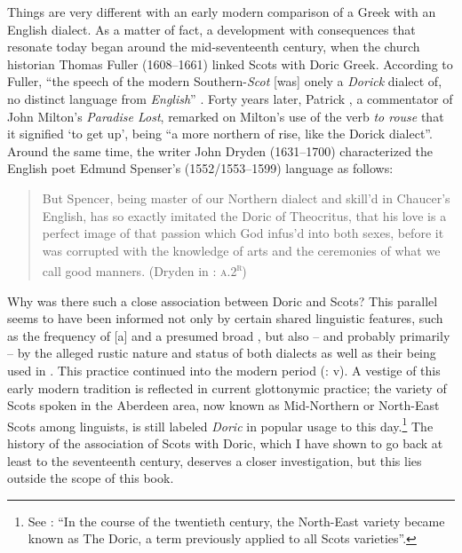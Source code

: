 Things are very different with an early modern comparison of a Greek with an English dialect. As a matter of fact, a development with consequences that resonate today began around the mid-seventeenth century, when the church historian Thomas Fuller (1608–1661) linked Scots with Doric Greek. According to Fuller, “the speech of the modern Southern-\textit{Scot} [was] onely a \textit{Dorick} dialect of, no distinct language from \textit{English}” \citep[81]{Fuller1655}. Forty years later, Patrick \citet[20]{Hume1695}, a commentator of John Milton’s \textit{Paradise Lost}, remarked on Milton’s use of the verb \textit{to rouse} that it signified ‘to get up’, being “a more northern  of rise, like the Dorick dialect”. Around the same time, the writer John Dryden (1631–1700) characterized the English poet Edmund Spenser’s (1552/1553–1599) language as follows:

\begin{quote}
But Spencer, being master of our Northern dialect and skill’d in Chaucer’s English, has so exactly imitated the Doric of Theocritus, that his love is a perfect image of that passion which God infus’d into both sexes, before it was corrupted with the knowledge of arts and the ceremonies of what we call good manners. (Dryden in \citealt{Virgil1697}: \textsc{a.2}\textsc{\textsuperscript{r}})
\end{quote}

Why was there such a close association between Doric and Scots? This parallel seems to have been informed not only by certain shared linguistic features, such as the frequency of [a] and a presumed broad , but also – and probably primarily – by the alleged rustic nature and status of both dialects as well as their being used in . This practice continued into the modern period (\citealt{Colvin1999}: v). A vestige of this early modern tradition is reflected in current glottonymic practice; the variety of Scots spoken in the Aberdeen area, now known as Mid-Northern or North-East Scots among linguists, is still labeled \textit{Doric} in popular usage to this day.\footnote{See \citet[116]{Mccoll2007}: “In the course of the twentieth century, the North-East variety became known as The Doric, a term previously applied to all Scots varieties”.} The history of the association of Scots with Doric, which I have shown to go back at least to the seventeenth century, deserves a closer investigation, but this lies outside the scope of this book.

